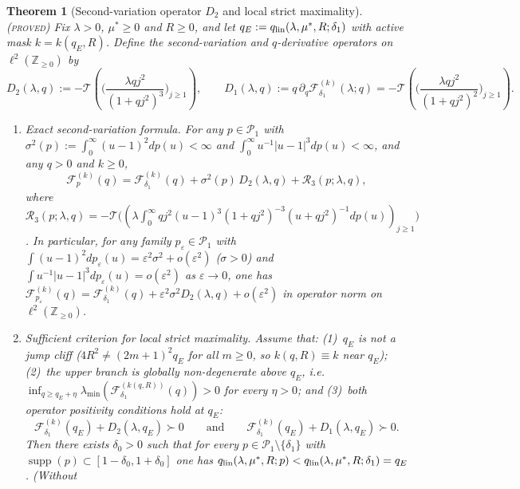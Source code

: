 \documentclass[11pt]{article}
\newcommand{\Fcal}{\mathcal F}
\newcommand{\muS}{\mu^{*}}
\newtheorem{theorem}{Theorem}[section]
\theoremstyle{definition}
\theoremstyle{remark}
\newcommand{\proved}{\textnormal{\textsc{(proved)}}}
\begin{document}
\begin{theorem}[Second-variation operator $D_2$ and local strict maximality]
\label{thm:d2}\proved
Fix $\lambda>0$, $\muS\ge0$ and $R\ge0$, and let $q_E:=q_{\rm lin}(\lambda,\muS,R;\delta_1)$
with active mask $k=k(q_E,R)$. Define the second-variation and $q$-derivative operators on
$\ell^2(\mathbb Z_{\ge0})$ by
\[
D_2(\lambda,q):=-\mathcal T\left(\Big(\frac{\lambda qj^2}{(1+qj^2)^3}\Big)_{j\ge1}\right),\qquad
D_1(\lambda,q):=q\,\partial_q\Fcal_{\delta_1}^{(k)}(\lambda;q)
=-\mathcal T\left(\Big(\frac{\lambda qj^2}{(1+qj^2)^2}\Big)_{j\ge1}\right).
\]
\begin{enumerate}[label=(\roman*),leftmargin=2.2em]
\item \emph{Exact second-variation formula.} For any $p\in\mathcal P_1$ with
$\sigma^2(p):=\int_0^\infty(u-1)^2dp(u)<\infty$ and $\int_0^\infty u^{-1}|u-1|^3dp(u)<\infty$,
and any $q>0$ and $k\ge0$,
\begin{equation}\label{eq:d2exact}
\Fcal_p^{(k)}(q)=\Fcal_{\delta_1}^{(k)}(q)+\sigma^2(p)\,D_2(\lambda,q)+\mathcal R_3(p;\lambda,q),
\end{equation}
where $\mathcal R_3(p;\lambda,q)=-\mathcal T\big((\lambda\int_0^\infty qj^2(u-1)^3(1+qj^2)^{-3}(u+qj^2)^{-1}dp(u))_{j\ge1}\big)$.
In particular, for any family $p_\varepsilon\in\mathcal P_1$ with
$\int(u-1)^2dp_\varepsilon(u)=\varepsilon^2\sigma^2+o(\varepsilon^2)$ ($\sigma>0$) and
$\int u^{-1}|u-1|^3dp_\varepsilon(u)=o(\varepsilon^2)$ as $\varepsilon\to0$, one has
$\Fcal_{p_\varepsilon}^{(k)}(q)=\Fcal_{\delta_1}^{(k)}(q)+\varepsilon^2\sigma^2D_2(\lambda,q)+o(\varepsilon^2)$
in operator norm on $\ell^2(\mathbb Z_{\ge0})$.
\item \emph{Sufficient criterion for local strict maximality.} Assume that:
(1)~$q_E$ is not a jump cliff ($4R^2\ne(2m+1)^2q_E$ for all $m\ge0$, so $k(q,R)\equiv k$ near
$q_E$); (2)~the upper branch is globally non-degenerate above $q_E$, i.e.\
$\inf_{q\ge q_E+\eta}\lambda_{\min}(\Fcal_{\delta_1}^{(k(q,R))}(q))>0$ for every $\eta>0$;
and (3)~both operator positivity conditions hold at $q_E$:
\begin{equation}\label{eq:d2pos}
\Fcal_{\delta_1}^{(k)}(q_E)+D_2(\lambda,q_E)\succ0
\qquad\text{and}\qquad
\Fcal_{\delta_1}^{(k)}(q_E)+D_1(\lambda,q_E)\succ0.
\end{equation}
Then there exists $\delta_0>0$ such that for every $p\in\mathcal P_1\setminus\{\delta_1\}$
with $\operatorname{supp}(p)\subset[1-\delta_0,1+\delta_0]$ one has
$q_{\rm lin}(\lambda,\muS,R;p)<q_{\rm lin}(\lambda,\muS,R;\delta_1)=q_E$. (Without

\end{enumerate}
\end{theorem}
\end{document}
